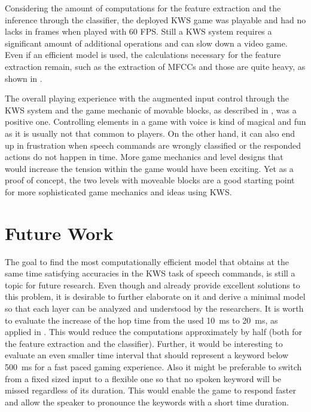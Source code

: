 Considering the amount of computations for the feature extraction and the inference through the classifier, the deployed KWS game was playable and had no lacks in frames when played with 60 FPS.
Still a KWS system requires a significant amount of additional operations and can slow down a video game.
Even if an efficient model is used, the calculations necessary for the feature extraction remain, such as the extraction of MFCCs and those are quite heavy, as shown in .

The overall playing experience with the augmented input control through the KWS system and the game mechanic of movable blocks, as described in , was a positive one.
Controlling elements in a game with voice is kind of magical and fun as it is usually not that common to players.
On the other hand, it can also end up in frustration when speech commands are wrongly classified or the responded actions do not happen in time.
More game mechanics and level designs that would increase the tension within the game would have been exciting.
Yet as a proof of concept, the two levels with moveable blocks are a good starting point for more sophisticated game mechanics and ideas using KWS.



\section{Future Work}
The goal to find the most computationally efficient model that obtains at the same time satisfying accuracies in the KWS task of speech commands, is still a topic for future research.
Even though \cite{Zhang2017} and \cite{Peter2020} already provide excellent solutions to this problem, it is desirable to further elaborate on it and derive a minimal model so that each layer can be analyzed and understood by the researchers.
It is worth to evaluate the increase of the hop time from the used \SI{10}{\milli\second} to \SI{20}{\milli\second}, as applied in \cite{Peter2020}.
This would reduce the computations approximately by half (both for the feature extraction and the classifier).
Further, it would be interesting to evaluate an even smaller time interval that should represent a keyword below \SI{500}{\milli\second} for a fast paced gaming experience.
Also it might be preferable to switch from a fixed sized input to a flexible one so that no spoken keyword will be missed regardless of its duration.
This would enable the game to respond faster and allow the speaker to pronounce the keywords with a short time duration.

